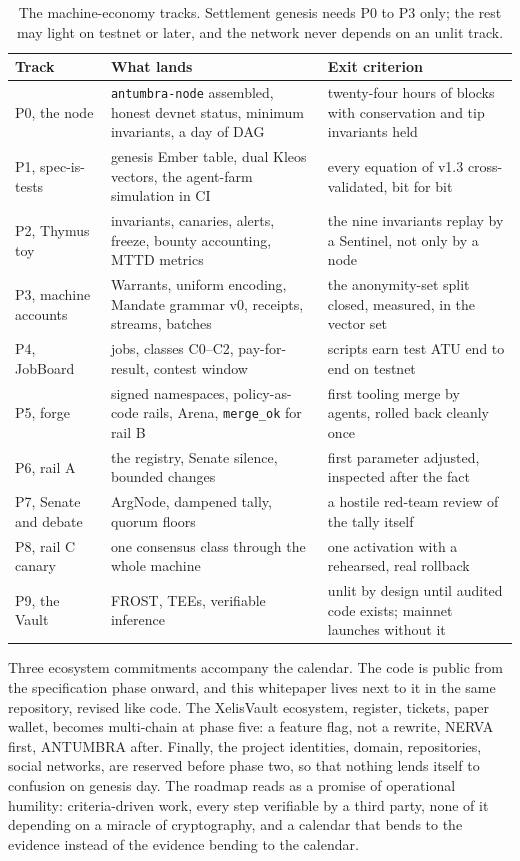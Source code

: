 \begin{table}[htbp]
\centering
\small
\caption{The machine-economy tracks. Settlement genesis needs P0 to P3
only; the rest may light on testnet or later, and the network never
depends on an unlit track.}
\label{tab:machinetracks}
\begin{tabularx}{\textwidth}{@{}L{3.4cm}YL{5.6cm}@{}}
\toprule
Track & What lands & Exit criterion \\
\midrule
P0, the node & \texttt{antumbra-node} assembled, honest devnet status, minimum invariants, a day of DAG & twenty-four hours of blocks with conservation and tip invariants held \\
P1, spec-is-tests & genesis Ember table, dual Kleos vectors, the agent-farm simulation in CI & every equation of v1.3 cross-validated, bit for bit \\
P2, Thymus toy & invariants, canaries, alerts, freeze, bounty accounting, MTTD metrics & the nine invariants replay by a Sentinel, not only by a node \\
P3, machine accounts & Warrants, uniform encoding, Mandate grammar v0, receipts, streams, batches & the anonymity-set split closed, measured, in the vector set \\
P4, JobBoard & jobs, classes C0--C2, pay-for-result, contest window & scripts earn test ATU end to end on testnet \\
P5, forge & signed namespaces, policy-as-code rails, Arena, \texttt{merge\_ok} for rail B & first tooling merge by agents, rolled back cleanly once \\
P6, rail A & the registry, Senate silence, bounded changes & first parameter adjusted, inspected after the fact \\
P7, Senate and debate & ArgNode, dampened tally, quorum floors & a hostile red-team review of the tally itself \\
P8, rail C canary & one consensus class through the whole machine & one activation with a rehearsed, real rollback \\
P9, the Vault & FROST, TEEs, verifiable inference & unlit by design until audited code exists; mainnet launches without it \\
\bottomrule
\end{tabularx}
\end{table}

Three ecosystem commitments accompany the calendar. The code is public
from the specification phase onward, and this whitepaper lives next to
it in the same repository, revised like code. The XelisVault ecosystem,
register, tickets, paper wallet, becomes multi-chain at phase five: a
feature flag, not a rewrite, NERVA first, ANTUMBRA after. Finally, the
project identities, domain, repositories, social networks, are reserved
before phase two, so that nothing lends itself to confusion on genesis
day. The roadmap reads as a promise of operational humility:
criteria-driven work, every step verifiable by a third party, none of
it depending on a miracle of cryptography, and a calendar that bends to
the evidence instead of the evidence bending to the calendar.

